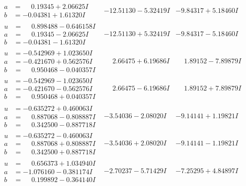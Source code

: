 \documentclass[1p]{elsarticle_modified}
\theoremstyle{definition}
\begin{document}
$$\begin{array}{c|c|c}
\begin{aligned}
a &= \phantom{-}0.19345 + 2.06625 I \\
b &= -0.04381 + 1.61320 I\end{aligned}
 & -12.51130 - 5.32419 I & -9.84317 + 5.18460 I \\ \hline\begin{aligned}
u &= \phantom{-}0.898488 - 0.646158 I \\
a &= \phantom{-}0.19345 - 2.06625 I \\
b &= -0.04381 - 1.61320 I\end{aligned}
 & -12.51130 + 5.32419 I & -9.84317 - 5.18460 I \\ \hline\begin{aligned}
u &= -0.542969 + 1.023650 I \\
a &= -0.421670 + 0.562576 I \\
b &= \phantom{-}0.950468 - 0.040357 I\end{aligned}
 & \phantom{-}2.66475 + 6.19686 I & \phantom{-}1.89152 - 7.89879 I \\ \hline\begin{aligned}
u &= -0.542969 - 1.023650 I \\
a &= -0.421670 - 0.562576 I \\
b &= \phantom{-}0.950468 + 0.040357 I\end{aligned}
 & \phantom{-}2.66475 - 6.19686 I & \phantom{-}1.89152 + 7.89879 I \\ \hline\begin{aligned}
u &= -0.635272 + 0.460063 I \\
a &= \phantom{-}0.887068 - 0.808887 I \\
b &= \phantom{-}0.342500 - 0.887718 I\end{aligned}
 & -3.54036 - 2.08020 I & -9.14141 + 1.19821 I \\ \hline\begin{aligned}
u &= -0.635272 - 0.460063 I \\
a &= \phantom{-}0.887068 + 0.808887 I \\
b &= \phantom{-}0.342500 + 0.887718 I\end{aligned}
 & -3.54036 + 2.08020 I & -9.14141 - 1.19821 I \\ \hline\begin{aligned}
u &= \phantom{-}0.656373 + 1.034940 I \\
a &= -1.076160 - 0.381174 I \\
b &= \phantom{-}0.199892 - 0.364140 I\end{aligned}
 & -2.70237 - 5.71429 I & -7.25295 + 4.84897 I \\ \hline\begin{aligned}

\end{aligned}
\end{array}$$
\end{document}
